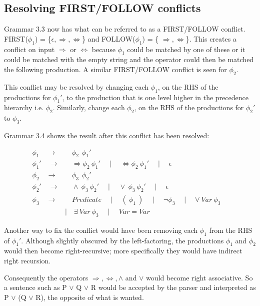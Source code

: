 \subsection{Resolving FIRST/FOLLOW conflicts}

Grammar 3.3 now has what can be referred to as a  FIRST/FOLLOW conflict. FIRST($\phi_1$) = \{$ \epsilon , \Rightarrow , \Leftrightarrow$\} and  FOLLOW($\phi_1$) = \{ $\Rightarrow, \Leftrightarrow$\}. This creates a conflict on input  $\Rightarrow$ or $\Leftrightarrow$ because $\phi_1$ could be matched by one of these or it could be matched with the empty string and the operator could then be matched the following production. A similar FIRST/FOLLOW conflict is seen for $\phi_2$.

This conflict may be resolved by changing each $\phi_1$, on the RHS of the productions for $\phi_1'$, to the production that is one level higher in the precedence hierarchy i.e. $\phi_2$.  Similarly, change each $\phi_2$, on the RHS of the productions for $\phi_2'$ to $\phi_3$.

Grammar 3.4 shows the result after this conflict has been resolved:

\begin{equation}
\begin{aligned}
\phi_1 \quad \to& \quad \phi_2 \:\: \phi_1'
\\ \phi_1' \quad \to& \quad \Rightarrow \phi_2 \: \phi_1' \quad
\mid \quad \Leftrightarrow \phi_2 \: \phi_1' \quad
\mid \quad \epsilon \quad
\\
\phi_2 \quad \to& \quad \phi_3 \:\: \phi_2'
\\ \phi_2' \quad \to& \quad \land \: \phi_3 \: \phi_2' \quad 
\mid \quad \lor \: \phi_3 \: \phi_2' \quad 
\mid \quad \epsilon \quad
\\
\phi_3 \quad \to& \quad Predicate \quad
\mid \quad ( \: \phi_1 \: ) \quad
\mid \quad \lnot \phi_3 \quad
\mid \quad \forall \: Var \: \phi_3 \quad
\\ &\mid \quad \exists \: Var \:\phi_3 \quad
\mid \quad Var = Var 
\end{aligned}
\end{equation}

Another way to fix the conflict would have been removing each $\phi_1$ from the RHS of $\phi_1'$. Although slightly obscured by the left-factoring, the productions $\phi_1$ and $\phi_2$ would then become right-recursive; more specifically they would have indirect right recursion.

Consequently the operators $\Rightarrow , \Leftrightarrow , \land$ and $\lor$ would become right associative. So a sentence such as P $\lor$ Q $\lor$ R would be accepted by the parser and interpreted as P $\lor$ (Q $\lor$ R), the opposite of what is wanted.  

